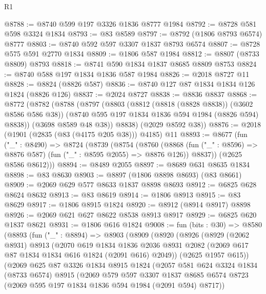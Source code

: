 \begin{lexlean}{R1}
\begin{coremodule}
@8788 := @8740 @599 @197 @3326 @1836 @8777 @1984
@8792 := @8728 @581 @598 @3324 @1834
@8793 := @83 @8589
@8797 := @8792 (@1806 @8793 @6574) @8777
@8803 := @8740 @592 @597 @3307 @1837 @8793 @6574
@8807 := @8728 @575 @591 @2770 @1834
@8809 := @1806 @587 @1984
@8812 := @8807 (@8733 @8809) @8793
@8818 := @8741 @590 @1834 @1837 @8685 @8809 @8753
@8824 := @8740 @588 @197 @1834 @1836 @587 @1984
@8826 := @2018 @8727 @11
@8828 := @8824 (@8826 @587)
@8836 := @8740 @127 @87 @1834 @1834 @126 @1824 (@8826 @126)
@8837 := @2024 @8727
@8838 := @8836 @8837
@8868 := @8772
    (@8782
      (@8788
        (@8797
          (@8803
            (@8812 (@8818 (@8828 @8838)) (@3602 @8586 @586 @38))
            (@8740 @595 @197 @1834 @1836 @594 @1984 (@8826 @594) @8838))
          (@3698 @8589 @48 @38))
        @8838)
      (@2029 @8592 @38))
@8876 := @2018 (@1901 (@2835 (@83 (@4175 @205 @38))) @4185) @11
@8893 := @8677
    (fun ("_" : @8490) =>
    @8724
      (@8739
        (@8754
          (@8760
            (@8868 (fun ("_" : @8596) => @8876 @587) (fun ("_" : @8595 @2055) => @8876 @126))
            @8837))
        (@2625 @8586 @8612)))
@8894 := @8489 @2055
@8897 := @8689 @631 @8635 @1834
@8898 := @83 @8630
@8903 := @8897 (@1806 @8898 @8693) (@83 @8661)
@8909 := @2069 @629 @577 @8633 @1837 @8898 @8693
@8912 := @6825 @628 @8624 @8632
@8913 := @83 @8619
@8914 := @1806 @8913
@8915 := @83 @8629
@8917 := @1806 @8915 @1824
@8920 := @8912 (@8914 @8917) @8898
@8926 := @2069 @621 @627 @8622 @8538 @8913 @8917
@8929 := @6825 @620 @1837 @8621
@8931 := @1806 @616 @1824
@9008 := fun (bits : @30) =>
  @8580
    (@8893
      (fun ("_" : @8894) =>
      @8903
        (@8909
          (@8920
            (@8926
              (@8929
                (@2062 @8931)
                @8913
                (@2070
                  @619
                  @1834
                  @1836
                  @2036
                  @8931
                  @2082
                  (@2069 @617 @87 @1834 @1834 @616 @1824 (@2091 @616) @2049))
                (@2625 @1957 @615))
              (@2069
                @625
                @87
                @3326
                @1834
                @8915
                @1824
                (@2057
                  @581
                  @624
                  @3324
                  @1834
                  (@8733 @6574)
                  @8915
                  (@2069
                    @579
                    @597
                    @3307
                    @1837
                    @8685
                    @6574
                    @8723
                    (@2069 @595 @197 @1834 @1836 @594 @1984 (@2091 @594) @8717))

\end{coremodule}
\end{lexlean}
